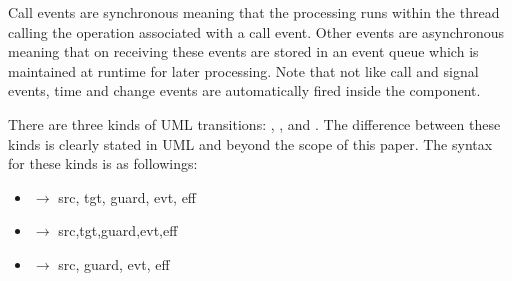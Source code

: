 Call events are synchronous meaning that the processing runs within the thread calling the operation associated with a call event.
Other events are asynchronous meaning that on receiving these events are stored in an event queue which is maintained at runtime for later processing.                                              
Note that not like call and signal events, time and change events are automatically fired inside the component.


\vskip 0.2cm
\noindent
{}
There are three kinds of UML transitions: , , and .
The difference between these kinds is clearly stated in UML and beyond the scope of this paper.
The syntax for these kinds is as followings:

\begin{itemize}[\footnotesize]
	\itemsep0em
	\item {} $\rightarrow$  src, tgt, guard, evt, eff \tb{);}
	
	\item {}$\rightarrow$ src,tgt,guard,evt,eff \tb{);}
	
	\item {} $\rightarrow$  src, guard, evt, eff \tb{);}
\end{itemize}

